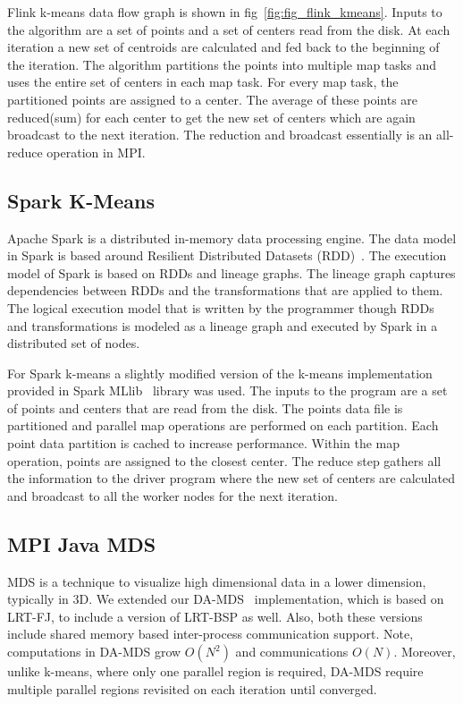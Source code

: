 \documentclass[10pt, conference, compsocconf]{IEEEtran}
\begin{document}
Flink k-means data flow graph is shown in fig~\ref{fig:fig_flink_kmeans}. Inputs to the algorithm are a set of points and a set of centers read from the disk. At each iteration a new set of centroids are calculated and fed back to the beginning of the iteration. The algorithm partitions the points into multiple map tasks and uses the entire set of centers in each map task. For every map task, the partitioned points are assigned to a center. The average of these points are reduced(sum) for each center to get the new set of centers which are again broadcast to the next iteration. The reduction and broadcast essentially is an all-reduce operation in MPI.

\subsection{Spark K-Means}
Apache Spark is a distributed in-memory data processing engine. The data model in Spark is based around Resilient Distributed Datasets (RDD)~\cite{zaharia2012resilient}. The execution model of Spark is based on RDDs and lineage graphs. The lineage graph captures dependencies between RDDs and the transformations that are applied to them. The logical execution model that is written by the programmer though RDDs and transformations is modeled as a lineage graph and executed by Spark in a distributed set of nodes.

For Spark k-means a slightly modified version of the k-means implementation provided in Spark MLlib~\cite{meng2016mllib} library was used. The inputs to the program are a set of points and centers that are read from the disk. The points data file is partitioned and parallel map operations are performed on each partition. Each point data partition is cached to increase performance. Within the map operation, points are assigned to the closest center. The reduce step gathers all the information to the driver program where the new set of centers are calculated and broadcast to all the worker nodes for the next iteration. 

\subsection{MPI Java \ac{MDS}}
\ac{MDS} is a technique to visualize high dimensional data in a lower dimension, typically in 3D. We extended our \ac{DA-MDS}~\cite{hpc2016:spidaljava} implementation, which is based on \ac{LRT-FJ}, to include a version of \ac{LRT-BSP} as well. Also, both these versions include shared memory based inter-process communication support. Note, computations in \ac{DA-MDS} grow $O(N^2)$ and communications $O(N)$. Moreover, unlike k-means, where only one parallel region is required, \ac{DA-MDS} require multiple parallel regions revisited on each iteration until converged.
\end{document}
